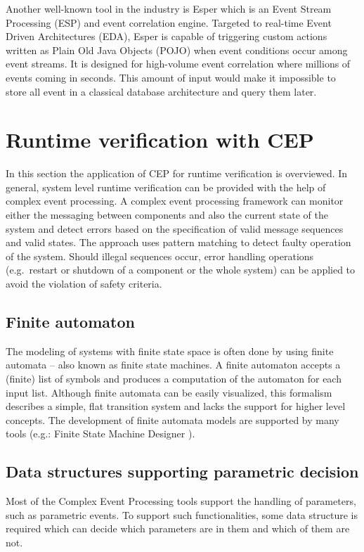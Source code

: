 Another well-known tool in the industry is Esper\citep{esper} which is an Event Stream Processing (ESP) and event correlation engine.
Targeted to real-time Event Driven Architectures (EDA), Esper is capable of triggering custom actions written as Plain Old Java Objects (POJO) when event conditions occur among event streams. It is designed for high-volume event correlation where millions of events coming in seconds. This amount of input would make it impossible to store all event in a classical database architecture and query them later.

\section{Runtime verification with CEP}
In this section the application of CEP for runtime verification is overviewed.
In general, system level runtime verification can be provided with the help of complex event processing. A complex event processing framework can monitor either the messaging between components and also the current state of the system and detect errors based on the specification of valid message sequences and valid states. 
The approach uses pattern matching to detect faulty operation of the system. Should illegal sequences occur, error handling operations (e.g.~restart or shutdown of a component or the whole system) can be applied to avoid the violation of safety criteria.

\subsection{Finite automaton }

The modeling of systems with finite state space is often done by using finite automata -- also known as finite state machines. A finite automaton accepts a (finite) list of symbols and produces a computation of the automaton for each input list.
Although finite automata can be easily visualized, this formalism describes a simple, flat transition system and lacks the support for higher level concepts. The development of finite automata models are supported by many tools (e.g.: Finite State Machine Designer \citep{fsmd}).

\subsection{Data structures supporting parametric decision}
Most of the Complex Event Processing tools support the handling of parameters, such as parametric events.
To support such functionalities, some data structure is required which can decide which parameters are in them and which of them are not.

